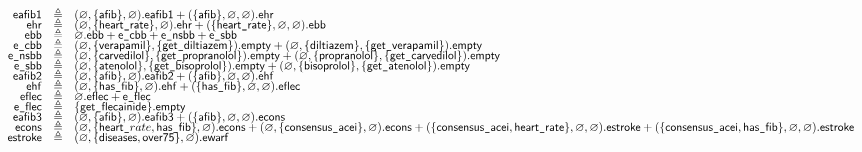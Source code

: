 \begin{figure}[t]
\fontsize{6}{0}
\[
\begin{array}{rcl}
\ent{eafib1} &  \triangleq 
& (\varnothing,\{\ent{afib}\},\varnothing).\ent{eafib1} 
+ (\{\ent{afib}\},\varnothing,\varnothing).\ent{ehr}
\\[-4pt]
\ent{ehr} &  \triangleq 
& (\varnothing,\{\ents{heart}{rate}\},\varnothing).\ent{ehr} 
+ (\{\ents{heart}{rate}\},\varnothing,\varnothing).\ent{ebb}
\\[-4pt]
\ent{ebb} &  \triangleq 
& \varnothing.\ent{ebb} + \ents{e}{cbb} + \ents{e}{nsbb} + \ents{e}{sbb}
\\[-4pt]
\ents{e}{cbb} &  \triangleq 
& (\varnothing,\{\ent{verapamil}\},\{\ents{get}{diltiazem}\}).\ent{empty} 
+ (\varnothing,\{\ent{diltiazem}\},\{\ents{get}{verapamil}\}).\ent{empty}
\\[-4pt]
\ents{e}{nsbb} &  \triangleq 
& (\varnothing,\{\ent{carvedilol}\},\{\ents{get}{propranolol}\}).\ent{empty} 
+ (\varnothing,\{\ent{propranolol}\},\{\ents{get}{carvedilol}\}).\ent{empty}
\\[-4pt]
\ents{e}{sbb} &  \triangleq 
& (\varnothing,\{\ent{atenolol}\},\{\ents{get}{bisoprolol}\}).\ent{empty} 
+ (\varnothing,\{\ent{bisoprolol}\},\{\ents{get}{atenolol}\}).\ent{empty}
\\[-4pt]
\ent{eafib2} &  \triangleq 
& (\varnothing,\{\ent{afib}\},\varnothing).\ent{eafib2} 
+ (\{\ent{afib}\},\varnothing,\varnothing).\ent{ehf}
\\[-4pt]
\ent{ehf} &  \triangleq 
& (\varnothing,\{\ents{has}{fib}\},\varnothing).\ent{ehf} 
+ (\{\ents{has}{fib}\},\varnothing,\varnothing).\ent{eflec}
\\[-4pt]
\ent{eflec} &  \triangleq 
& \varnothing.\ent{eflec} + \ents{e}{flec}
\\[-4pt]
\ents{e}{flec} &  \triangleq 
& \{\ents{get}{flecainide}\}.\ent{empty}
\\[-4pt]
\ent{eafib3} &  \triangleq 
& (\varnothing,\{\ent{afib}\},\varnothing).\ent{eafib3} 
+ (\{\ent{afib}\},\varnothing,\varnothing).\ent{econs}
\\[-4pt]
\ent{econs} &  \triangleq 
& (\varnothing,\{\ents{heart}\ent{rate},\ents{has}{fib}\},\varnothing).\ent{econs} 
+ (\varnothing,\{\ents{consensus}{acei}\},\varnothing).\ent{econs} 
+ (\{\ents{consensus}{acei},\ents{heart}{rate}\},\varnothing,\varnothing).\ent{estroke} 
+ (\{\ents{consensus}{acei},\ents{has}{fib}\},\varnothing,\varnothing).\ent{estroke} 
\\[-4pt]
\ent{estroke} &  \triangleq 
& (\varnothing,\{\ent{diseases},\ent{over75}\},\varnothing).\ent{ewarf} 

\end{array}\]
\end{figure}
